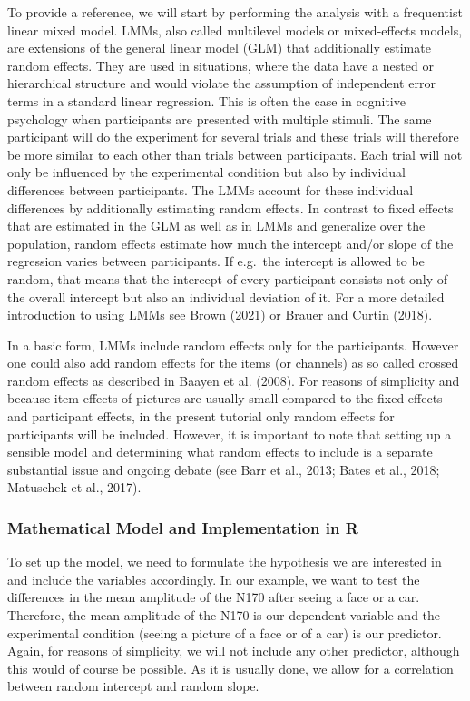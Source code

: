 \documentclass[
  doc,12pt,floatsintext]{apa7}
\begin{document}
To provide a reference, we will start by performing the analysis with a frequentist linear mixed model. LMMs, also called multilevel models or mixed-effects models, are extensions of the general linear model (GLM) that additionally estimate random effects. They are used in situations, where the data have a nested or hierarchical structure and would violate the assumption of independent error terms in a standard linear regression. This is often the case in cognitive psychology when participants are presented with multiple stimuli. The same participant will do the experiment for several trials and these trials will therefore be more similar to each other than trials between participants. Each trial will not only be influenced by the experimental condition but also by individual differences between participants. The LMMs account for these individual differences by additionally estimating random effects. In contrast to fixed effects that are estimated in the GLM as well as in LMMs and generalize over the population, random effects estimate how much the intercept and/or slope of the regression varies between participants. If e.g.~the intercept is allowed to be random, that means that the intercept of every participant consists not only of the overall intercept but also an individual deviation of it. For a more detailed introduction to using LMMs see Brown (2021) or Brauer and Curtin (2018).

In a basic form, LMMs include random effects only for the participants. However one could also add random effects for the items (or channels) as so called crossed random effects as described in Baayen et al. (2008). For reasons of simplicity and because item effects of pictures are usually small compared to the fixed effects and participant effects, in the present tutorial only random effects for participants will be included. However, it is important to note that setting up a sensible model and determining what random effects to include is a separate substantial issue and ongoing debate (see Barr et al., 2013; Bates et al., 2018; Matuschek et al., 2017).

\subsubsection{Mathematical Model and Implementation in R}\label{mathematical-model-and-implementation-in-r}

To set up the model, we need to formulate the hypothesis we are interested in and include the variables accordingly. In our example, we want to test the differences in the mean amplitude of the N170 after seeing a face or a car. Therefore, the mean amplitude of the N170 is our dependent variable and the experimental condition (seeing a picture of a face or of a car) is our predictor. Again, for reasons of simplicity, we will not include any other predictor, although this would of course be possible. As it is usually done, we allow for a correlation between random intercept and random slope.
\end{document}

